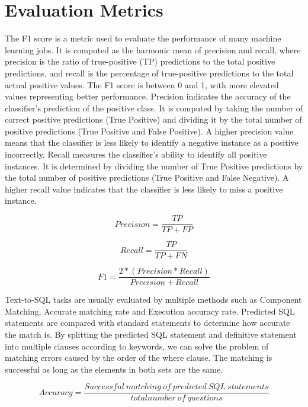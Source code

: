 \section{Evaluation Metrics} \label{eval}

The F1 score is a metric used to evaluate the performance of many machine learning jobs. It is computed as the harmonic mean of precision and recall, where precision is the ratio of true-positive (TP) predictions to the total positive predictions, and recall is the percentage of true-positive predictions to the total actual positive values. The F1 score is between 0 and 1, with more elevated values representing better performance.
Precision indicates the accuracy of the classifier's prediction of the positive class. It is computed by taking the number of correct positive predictions (True Positive) and dividing it by the total number of positive predictions (True Positive and False Positive). A higher precision value means that the classifier is less likely to identify a negative instance as a positive incorrectly.
Recall measures the classifier's ability to identify all positive instances. It is determined by dividing the number of True Positive predictions by the total number of positive predictions (True Positive and False Negative). A higher recall value indicates that the classifier is less likely to miss a positive instance.

\begin{equation}
    Precision = \frac{TP}{TP + FP}
\end{equation}

\begin{equation}
    Recall = \frac{TP}{TP + FN}
\end{equation}

\begin{equation}
    F1 = \frac{2 * (Precision * Recall)}{Precision + Recall}
\end{equation}

Text-to-SQL tasks are usually evaluated by multiple methods such as Component Matching, Accurate matching rate and Execution accuracy rate. Predicted SQL statements are compared with standard statements to determine how accurate the match is.
By splitting the predicted SQL statement and definitive statement into multiple clauses according to keywords, we can solve the problem of matching errors caused by the order of the where clause. The matching is successful as long as the elements in both sets are the same.

\begin{equation}
    Accuracy = \frac{Successful\ matching\ of\ predicted\ SQL\ statements}{total number\ of\ questions}
    \label{fig:acc1}
\end{equation}

